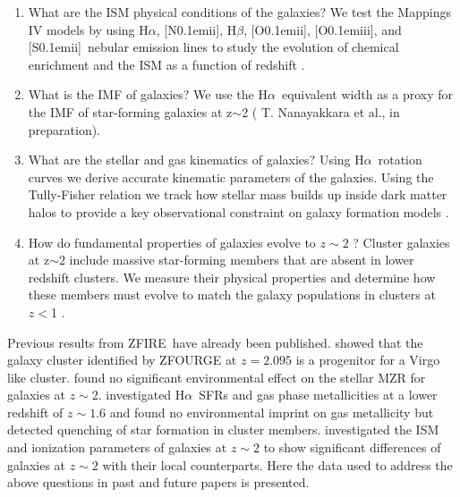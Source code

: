 \documentclass[iop]{emulateapj}
\newcommand{\Halpha}{H$\alpha$}
\newcommand{\Hbeta}{H$\beta$}
\newcommand{\SII}{[\hbox{{\rm S}\kern 0.1em{\sc ii}}]}
\newcommand{\NII}{[\hbox{{\rm N}\kern 0.1em{\sc ii}}]}
\newcommand{\OII}{[\hbox{{\rm O}\kern 0.1em{\sc ii}}]}
\newcommand{\OIII}{[\hbox{{\rm O}\kern 0.1em{\sc iii}}]}
\newcommand{\around}{$\sim$}
\begin{document}
\begin{enumerate}
\item  What are the ISM physical conditions of the galaxies? 
We test the Mappings IV models by using \Halpha, \NII, \Hbeta, \OII, \OIII, and \SII\ nebular emission lines to study the evolution of chemical enrichment and the ISM as a function of redshift \citep{Kewley2016}. 

\item  What is the IMF of galaxies?
We use the \Halpha\ equivalent width as a proxy for the IMF of star-forming galaxies at z\around2 ( T. Nanayakkara et al., in preparation).  
		
\item  What are the stellar and gas kinematics of galaxies?
Using \Halpha\ rotation curves we derive accurate kinematic parameters of the galaxies. Using the Tully-Fisher relation \citep{Tully1977} we track how stellar mass builds up inside dark matter halos to provide a key observational constraint on galaxy formation models \citep[][C. Straatman et al., in preparation]{Alcorn2016}. 

\item  How do fundamental properties of galaxies evolve to $z\sim2$ ?
Cluster galaxies at z\around2 include massive star-forming members that are absent in lower redshift clusters. 
We measure their physical properties and determine how these members must evolve to match the galaxy populations in clusters at $z<$1 \citep{Tran2015, Kacprzak2015}. 



\end{enumerate}


Previous results from ZFIRE\ have already been published. 
\citet{Yuan2014} showed that the galaxy cluster identified by ZFOURGE \citep{Spitler2012} at $z=2.095$ is a progenitor for a Virgo like cluster. \citet{Kacprzak2015} found no significant environmental effect on the stellar MZR for galaxies at $z\sim2$.  \citet{Tran2015} investigated \Halpha\ SFRs and gas phase metallicities at a lower redshift of $z\sim1.6$ and found no environmental imprint on gas metallicity but detected quenching of star formation in cluster members. 
\citet{Kewley2016} investigated the ISM and ionization parameters of galaxies at $z\sim2$ to show significant differences of galaxies at $z\sim2$ with their local counterparts.
Here the data used to address the above questions in past and future papers is presented.
\end{document}
